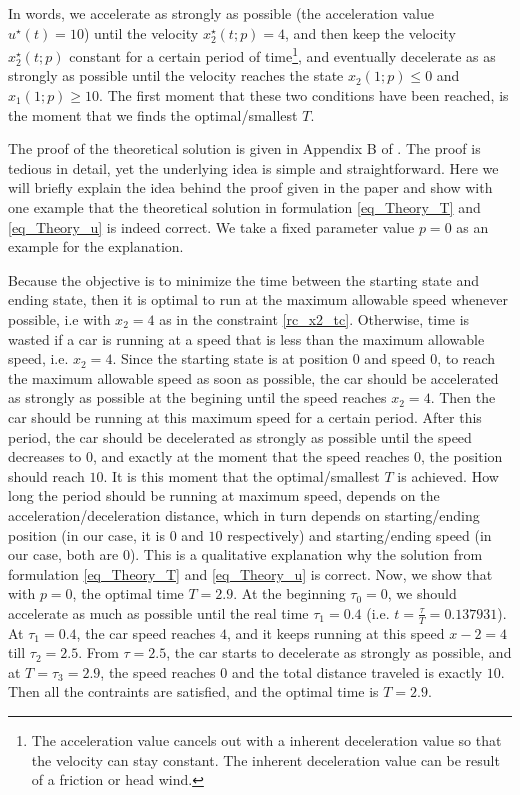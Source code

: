 \documentclass  [
  paper    = a4,
  BCOR     = 10mm,
  twoside,
  fontsize = 12pt,
  fleqn,
  toc      = bibnumbered,
  toc      = listofnumbered,
  numbers  = noendperiod,
  headings = normal,
  listof   = leveldown,
  version  = 3.03
]                                       {scrreprt}
\newcommand{\<}{\langle}
\renewcommand{\>}{\rangle}
\begin{document}
In words, we accelerate as strongly as possible (the acceleration value $u^\star(t)=10$) until the velocity $x^\star_2(t;p)=4$, and then keep the velocity $x^\star_2(t;p)$ constant for a certain period of time\footnote{The acceleration value cancels out with a inherent deceleration value so that the velocity can stay constant. The inherent deceleration value can be result of a friction or head wind.}, and eventually decelerate as as strongly as possible until the velocity reaches the state $x_2(1;p) \leq 0$ and $x_1(1;p) \geq 10$. The first moment that these two conditions have been reached, is the moment that we finds the optimal/smallest $T$. 

The proof of the theoretical solution is given in Appendix B of \cite{MatSch22}. The proof is tedious in detail, yet the underlying idea is simple and straightforward. Here we will briefly explain the idea behind the proof given in the paper \cite{MatSch22} and show with one example that the theoretical solution in formulation \ref{eq_Theory_T} and \ref{eq_Theory_u} is indeed correct. We take a fixed parameter value $p=0$ as an example for the explanation.

Because the objective is to minimize the time between the starting state and ending state, then it is optimal to run at the maximum allowable speed whenever possible, i.e with $x_2 =4$ as in the constraint \ref{rc_x2_tc}. Otherwise, time is wasted if a car is running at a speed that is less than the maximum allowable speed, i.e. $x_2=4$. Since the starting state is at position $0$ and speed $0$, to reach the maximum allowable speed as soon as possible, the car should be accelerated as strongly as possible at the begining until the speed reaches $x_2 =4$. Then the car should be running at this maximum speed for a certain period. After this period, the car should be decelerated as strongly as possible until the speed decreases to $0$, and exactly at the moment that the speed reaches $0$, the position should reach $10$. It is this moment that the optimal/smallest $T$ is achieved. How long the period should be running at maximum speed, depends on the acceleration/deceleration distance, which in turn depends on  starting/ending position (in our case, it is $0$ and $10$ respectively) and starting/ending speed (in our case, both are $0$). This is a qualitative explanation why the solution from formulation \ref{eq_Theory_T} and \ref{eq_Theory_u} is correct. Now, we show that with $p=0$, the optimal time $T=2.9$. At the beginning $\tau_0 = 0$,  we should accelerate as much as possible until the real time $\tau_1=0.4$ (i.e. $t= \frac{\tau}{T} = 0.137931$). At $\tau_1=0.4$, the car speed reaches $4$, and it keeps running at this speed $x-2=4$ till $\tau_2=2.5$. From $\tau=2.5$, the car starts to decelerate as strongly as possible, and at $T=\tau_3=2.9$, the speed reaches $0$ and the total distance traveled is exactly $10$. Then all the contraints are satisfied, and the optimal time is $T=2.9$. 
\end{document}
